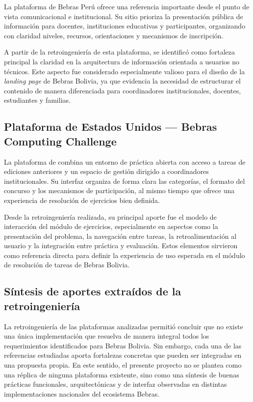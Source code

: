 La plataforma de Bebras Perú \parencite{bebrasperu} ofrece una referencia importante desde el punto de vista comunicacional e institucional. Su sitio prioriza la presentación pública de información para docentes, instituciones educativas y participantes, organizando con claridad niveles, recursos, orientaciones y mecanismos de inscripción.

A partir de la retroingeniería de esta plataforma, se identificó como fortaleza principal la claridad en la arquitectura de información orientada a usuarios no técnicos. Este aspecto fue considerado especialmente valioso para el diseño de la \emph{landing page} de Bebras Bolivia, ya que evidencia la necesidad de estructurar el contenido de manera diferenciada para coordinadores institucionales, docentes, estudiantes y familias.

\subsection{Plataforma de Estados Unidos --- Bebras Computing Challenge}

La plataforma de \textcite{bebraseeuu} combina un entorno de práctica abierta con acceso a tareas de ediciones anteriores y un espacio de gestión dirigido a coordinadores institucionales. Su interfaz organiza de forma clara las categorías, el formato del concurso y los mecanismos de participación, al mismo tiempo que ofrece una experiencia de resolución de ejercicios bien definida.

Desde la retroingeniería realizada, su principal aporte fue el modelo de interacción del módulo de ejercicios, especialmente en aspectos como la presentación del problema, la navegación entre tareas, la retroalimentación al usuario y la integración entre práctica y evaluación. Estos elementos sirvieron como referencia directa para definir la experiencia de uso esperada en el módulo de resolución de tareas de Bebras Bolivia.

\subsection{Síntesis de aportes extraídos de la retroingeniería}

La retroingeniería de las plataformas analizadas permitió concluir que no existe una única implementación que resuelva de manera integral todos los requerimientos identificados para Bebras Bolivia. Sin embargo, cada una de las referencias estudiadas aporta fortalezas concretas que pueden ser integradas en una propuesta propia. En este sentido, el presente proyecto no se plantea como una réplica de ninguna plataforma existente, sino como una síntesis de buenas prácticas funcionales, arquitectónicas y de interfaz observadas en distintas implementaciones nacionales del ecosistema Bebras.

